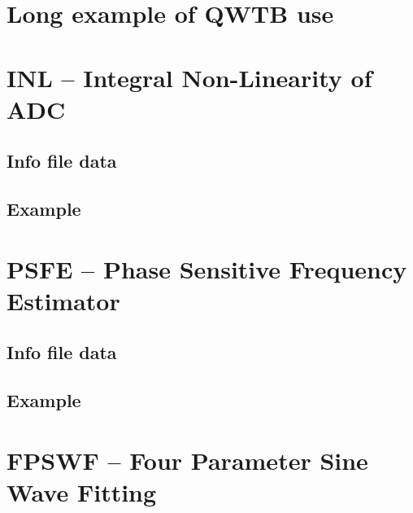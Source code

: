 \documentclass[12pt,a4paper,oneside]{report} %
\begin{document}
\chapter{Long example of QWTB use} %


\chapter{INL -- Integral Non-Linearity of ADC} %
\def\infosection{Info file data}
\def\examplesection{Example}
\section*{\infosection} %

\section*{\examplesection} %


\chapter{PSFE -- Phase Sensitive Frequency Estimator} %
\section*{\infosection} %

\section*{\examplesection} %


\chapter{FPSWF -- Four Parameter Sine Wave Fitting} %
\end{document}
